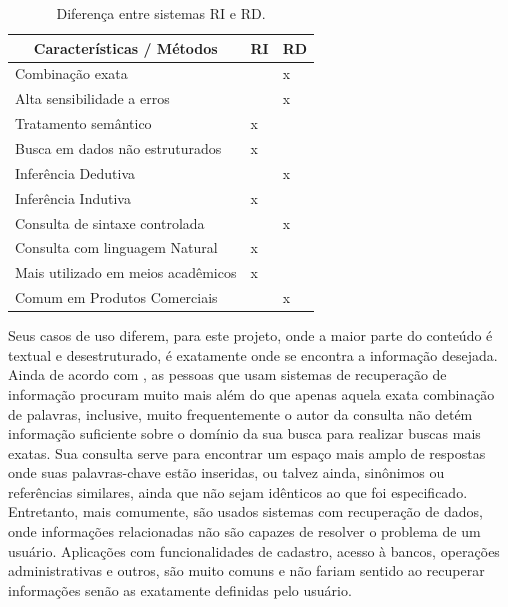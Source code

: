 \begin{table}[htb]
	\centering
	\caption{Diferença entre sistemas \ac{RI} e \ac{RD}.}
	\label{tab:RIxRD}
	\begin{tabular}{|m{7cm} | m{2cm} | m{2cm} |}

		\hline
		
		\multicolumn{1}{|c|}{\bfseries Características / Métodos } & \multicolumn{1}{c|}{\bfseries RI} & \multicolumn{1}{c|}{\bfseries RD}\\ \hline
		Combinação exata   					&		&	x 	\\ \hline
		Alta sensibilidade a erros   			&		&	x  	\\ \hline
		Tratamento semântico   				&	x 	&	 	\\ \hline
		Busca em dados não estruturados   	&	x 	&	 	\\ \hline
		Inferência Dedutiva  					&		&	x  	\\ \hline
		Inferência Indutiva   					&	x 	&	 	\\ \hline
		Consulta de sintaxe controlada   		&		&	x 	\\ \hline
		Consulta com linguagem Natural   	&	x 	&	 	\\ \hline
		Mais utilizado em meios acadêmicos   &	x 	&	 	\\ \hline
		Comum em Produtos Comerciais   	&		&	x 	\\ \hline
		
	\end{tabular}
\end{table}

Seus casos de uso diferem, para este projeto, onde a maior parte do conteúdo é textual e desestruturado, é exatamente onde se encontra a informação desejada. Ainda de acordo com \cite{Fred2008}, as pessoas que usam sistemas de recuperação de informação procuram muito mais além do que apenas aquela exata combinação de palavras, inclusive, muito frequentemente o autor da consulta não detém informação suficiente sobre o domínio da sua busca para realizar buscas mais exatas. Sua consulta serve para encontrar um espaço mais amplo de respostas onde suas palavras-chave estão inseridas, ou talvez ainda, sinônimos ou referências similares, ainda que não sejam idênticos ao que foi especificado. Entretanto, mais comumente, são usados sistemas com recuperação de dados, onde informações relacionadas não são capazes de resolver o problema de um usuário. Aplicações com funcionalidades de cadastro, acesso à bancos, operações administrativas e outros, são muito comuns e não fariam sentido ao recuperar informações senão as exatamente definidas pelo usuário. 

